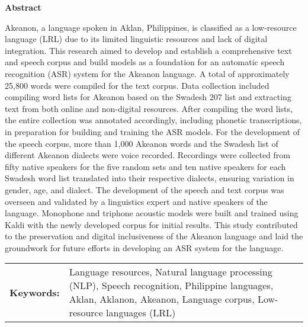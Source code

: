 \begin{center}
\textbf{Abstract}
\end{center}
\setlength{\parindent}{0pt}
Akeanon, a language spoken in Aklan, Philippines, is classified as a low-resource language (LRL) due to its limited linguistic resources and lack of digital integration. This research aimed to develop and establish a comprehensive text and speech corpus and build models as a foundation for an automatic speech recognition (ASR) system for the Akeanon language. A total of approximately 25,800 words were compiled for the text corpus. Data collection included compiling word lists for Akeanon based on the Swadesh 207 list and extracting text from both online and non-digital resources. After compiling the word lists, the entire collection was annotated accordingly, including phonetic transcriptions, in preparation for building and training the ASR models. For the development of the speech corpus, more than 1,000 Akeanon words and the Swadesh list of different Akeanon dialects were voice recorded. Recordings were collected from fifty native speakers for the five random sets and ten native speakers for each Swadesh word list translated into their respective dialects, ensuring variation in gender, age, and dialect. The development of the speech and text corpus was overseen and validated by a linguistics expert and native speakers of the language. Monophone and triphone acoustic models were built and trained using Kaldi with the newly developed corpus for initial results. This study contributed to the preservation and digital inclusiveness of the Akeanon language and laid the groundwork for future efforts in developing an ASR system for the language.



\begin{tabular}{lp{4.25in}}
\hspace{-0.5em}\textbf{Keywords:}\hspace{0.25em} & Language resources, Natural language processing (NLP), Speech recognition, Philippine languages, Aklan, Aklanon, Akeanon, Language corpus, Low-resource languages (LRL)\\
\end{tabular}
